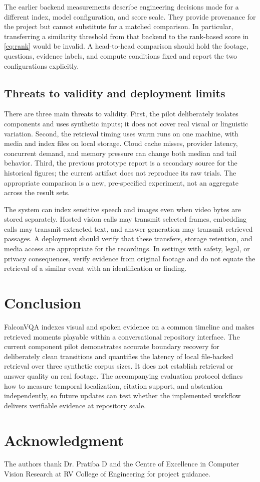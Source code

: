 \documentclass{ieeeaccess}
\begin{document}
The earlier backend measurements describe engineering decisions made for a different index, model configuration, and score scale. They provide provenance for the project but cannot substitute for a matched comparison. In particular, transferring a similarity threshold from that backend to the rank-based score in \eqref{eq:rank} would be invalid. A head-to-head comparison should hold the footage, questions, evidence labels, and compute conditions fixed and report the two configurations explicitly.

\subsection{Threats to validity and deployment limits}
There are three main threats to validity. First, the pilot deliberately isolates components and uses synthetic inputs; it does not cover real visual or linguistic variation. Second, the retrieval timing uses warm runs on one machine, with media and index files on local storage. Cloud cache misses, provider latency, concurrent demand, and memory pressure can change both median and tail behavior. Third, the previous prototype report is a secondary source for the historical figures; the current artifact does not reproduce its raw trials. The appropriate comparison is a new, pre-specified experiment, not an aggregate across the result sets.

The system can index sensitive speech and images even when video bytes are stored separately. Hosted vision calls may transmit selected frames, embedding calls may transmit extracted text, and answer generation may transmit retrieved passages. A deployment should verify that these transfers, storage retention, and media access are appropriate for the recordings. In settings with safety, legal, or privacy consequences, verify evidence from original footage and do not equate the retrieval of a similar event with an identification or finding.

\section{Conclusion}
\label{sec:conclusion}
FalconVQA indexes visual and spoken evidence on a common timeline and makes retrieved moments playable within a conversational repository interface. The current component pilot demonstrates accurate boundary recovery for deliberately clean transitions and quantifies the latency of local file-backed retrieval over three synthetic corpus sizes. It does not establish retrieval or answer quality on real footage. The accompanying evaluation protocol defines how to measure temporal localization, citation support, and abstention independently, so future updates can test whether the implemented workflow delivers verifiable evidence at repository scale.

\section*{Acknowledgment}
The authors thank Dr. Pratiba D and the Centre of Excellence in Computer Vision Research at RV College of Engineering for project guidance.


\EOD
\end{document}
